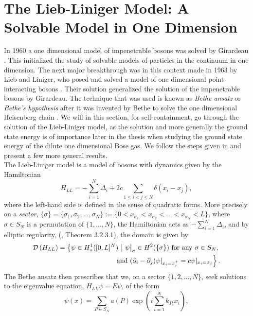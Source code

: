 \section{The Lieb-Liniger Model: A Solvable Model in One Dimension} \label{SectionLiebLinigerModel}
In 1960 a one dimensional model of impenetrable bosons was solved by Girardeau \cite{girardeau1960relationship}. This initialized the study of solvable models of particles in the continuum in one dimension. The next major breakthrough was in this context made in 1963 by Lieb and Liniger, who posed and solved a model of one dimensional point interacting bosons \cite{lieb1963exact}. Their solution generalized the solution of the impenetrable bosons by Girardeau. The technique that was used is known as \emph{Bethe ansatz} or \emph{Bethe's hypothesis} after it was invented by Bethe to solve the one dimensional Heisenberg chain \cite{bethe1931theorie}. We will in this section, for self-containment, go through the solution of the Lieb-Liniger model, as the solution and more generally the ground state energy is of importance later in the thesis when studying the ground state energy of the dilute one dimensional Bose gas. We follow the steps given in \cite{lieb1963exact} and present a few more general results.\\
The Lieb-Liniger model is a model of bosons with dynamics given by the Hamiltonian \begin{equation}
H_{LL}=-\sum_{i=1}^{N}\Delta_i+2c \sum_{1\leq i<j\leq N}\delta(x_i-x_j),
\end{equation}
where the left-hand side is defined in the sense of quadratic forms. More precisely on a \emph{sector}, $\{\sigma\}=\{\sigma_1,\sigma_2,\ldots,\sigma_N\}:=\{0< x_{\sigma_1}< x_{\sigma_2} < \ldots < x_{\sigma_N}< L\} $, where $ \sigma\in S_N $ is a permutation of $ \{1,\ldots,N\} $, the Hamiltonian acts as $ -\sum_{i=1}^{N}\Delta_i $, and by elliptic regularity, (\cite{grisvard2011elliptic}, Theorem 3.2.3.1), the domain is given by \begin{equation*}
	\begin{aligned}
	\dom{H_{LL}}=\left\{\psi\in H_s^1([0,L]^N)\ \middle\vert\ \psi\big\rvert_{\sigma}\in H^2(\{\sigma\})\text{ for any }\sigma\in S_{N},\right.\\ \left. \text{ and } (\partial_i-\partial_j)\psi\rvert_{x_i=x_j^+}=c\psi\rvert_{x_i=x_j}\right\}.
	\end{aligned}
\end{equation*}
The Bethe ansatz then prescribes that we, on a sector $ \{1,2,\ldots,N\} $, seek solutions to the eigenvalue equation, $ H_{LL}\psi=E\psi $, of the form\begin{equation}\label{EqBetheAnsatz}
\psi(x)=\sum_{P\in S_N} a(P)\exp\left(i\sum_{i=1}^{N}k_{P_i}x_i\right),
\end{equation}
